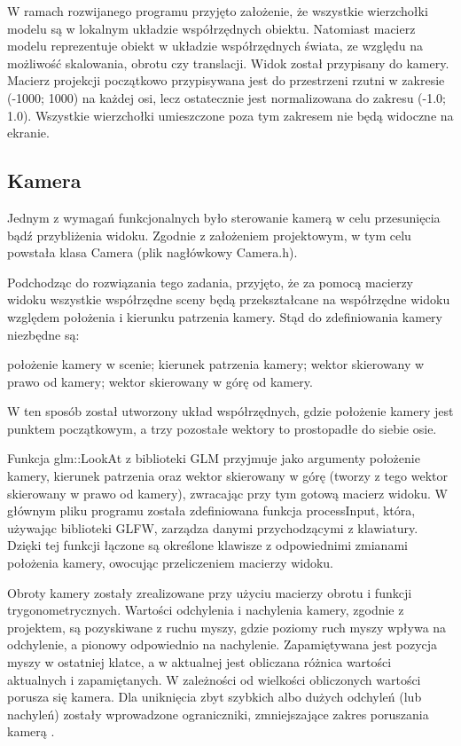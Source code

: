 W ramach rozwijanego programu przyjęto założenie, że wszystkie wierzchołki modelu są w lokalnym układzie współrzędnych obiektu. Natomiast macierz modelu reprezentuje  obiekt w układzie współrzędnych świata, ze względu na możliwość skalowania, obrotu czy translacji. Widok został przypisany do kamery. Macierz projekcji początkowo przypisywana jest do przestrzeni rzutni w zakresie (-1000; 1000) na każdej osi, lecz ostatecznie jest normalizowana do zakresu (-1.0; 1.0). Wszystkie wierzchołki umieszczone poza tym zakresem nie będą widoczne na ekranie.

\subsection{Kamera}
Jednym z wymagań funkcjonalnych było sterowanie kamerą w celu przesunięcia bądź przybliżenia widoku. Zgodnie z założeniem projektowym, w tym celu powstała klasa Camera (plik nagłówkowy Camera.h).

Podchodząc do rozwiązania tego zadania, przyjęto, że za pomocą macierzy widoku wszystkie współrzędne sceny będą przekształcane na współrzędne widoku względem położenia i kierunku patrzenia kamery. Stąd do zdefiniowania kamery niezbędne są:
\begin{itemize}
\itemi położenie kamery w scenie;
\itemi kierunek patrzenia kamery;
\itemi wektor skierowany w prawo od kamery;
\itemi wektor skierowany w górę od kamery.
\end{itemize}
W ten sposób został utworzony układ współrzędnych, gdzie położenie kamery jest punktem początkowym, a trzy pozostałe wektory to prostopadłe do siebie osie.

Funkcja glm::LookAt z biblioteki GLM przyjmuje jako argumenty położenie kamery, kierunek patrzenia oraz wektor skierowany w górę (tworzy z tego wektor skierowany w prawo od kamery), zwracając przy tym gotową macierz widoku. W głównym pliku programu została zdefiniowana funkcja processInput, która, używając biblioteki GLFW, zarządza danymi przychodzącymi z klawiatury. Dzięki tej funkcji łączone są określone klawisze z odpowiednimi zmianami położenia kamery, owocując przeliczeniem macierzy widoku.

Obroty kamery zostały zrealizowane przy użyciu macierzy obrotu i funkcji trygonometrycznych. Wartości odchylenia i nachylenia kamery, zgodnie z projektem, są pozyskiwane z ruchu myszy, gdzie poziomy ruch myszy wpływa na odchylenie, a pionowy odpowiednio na nachylenie. Zapamiętywana jest pozycja myszy w ostatniej klatce, a w aktualnej jest obliczana różnica wartości aktualnych i zapamiętanych. W zależności od wielkości obliczonych wartości porusza się kamera. Dla uniknięcia zbyt szybkich albo dużych odchyleń (lub nachyleń) zostały wprowadzone ograniczniki, zmniejszające zakres poruszania kamerą \cite{learnopengl}.

